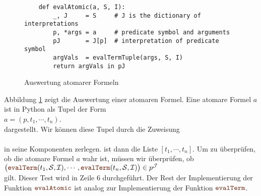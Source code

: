 \begin{figure}[!ht]
\centering
\begin{verbatim}
    def evalAtomic(a, S, I):
        _, J     = S     # J is the dictionary of interpretations
        p, *args = a     # predicate symbol and arguments
        pJ       = J[p]  # interpretation of predicate symbol
        argVals  = evalTermTuple(args, S, I)
        return argVals in pJ
\end{verbatim}
\vspace*{-0.3cm}
\caption{Auswertung atomarer Formeln}
\label{fig:evalAtomic.ipynb}
\end{figure}

Abbildung \ref{fig:evalAtomic.ipynb} zeigt die Auswertung einer atomaren Formel.  Eine atomare Formel $a$ 
ist in Python als Tupel der Form
\\[0.2cm]
\hspace*{1.3cm}
$a = (p, t_1,\cdots,t_n)$.
\\[0.2cm]
dargestellt.  Wir können diese Tupel durch die Zuweisung
\\[0.2cm]
\hspace*{1.3cm}
\\[0.2cm]
in seine Komponenten zerlegen.   ist dann die Liste $[t_1,\cdots,t_n]$.
Um zu überprüfen, ob die atomare Formel $a$ wahr ist, müssen wir überprüfen, ob
\\[0.2cm]
\hspace*{1.3cm}
$\bigl(\mytt{evalTerm}(t_1,\mathcal{S}, \mathcal{I}), \cdots, \mytt{evalTerm}(t_n,\mathcal{S},\mathcal{I})\bigr)\in p^\mathcal{J}$
\\[0.2cm]
gilt.  Dieser Test wird in Zeile 6 durchgeführt. Der Rest der Implementierung der Funktion
$\mytt{evalAtomic}$ ist analog zur Implementierung der Funktion $\mytt{evalTerm}$.


